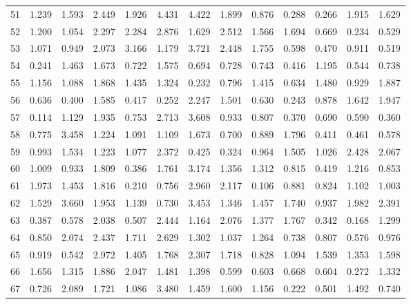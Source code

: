 \begin{tabular}{lrrrrrrrrrrrr}
51  &  1.239 &  1.593 &  2.449 &  1.926 &  4.431 &  4.422 &  1.899 &  0.876 &  0.288 &  0.266 &  1.915 &  1.629 \\
52  &  1.200 &  1.054 &  2.297 &  2.284 &  2.876 &  1.629 &  2.512 &  1.566 &  1.694 &  0.669 &  0.234 &  0.529 \\
53  &  1.071 &  0.949 &  2.073 &  3.166 &  1.179 &  3.721 &  2.448 &  1.755 &  0.598 &  0.470 &  0.911 &  0.519 \\
54  &  0.241 &  1.463 &  1.673 &  0.722 &  1.575 &  0.694 &  0.728 &  0.743 &  0.416 &  1.195 &  0.544 &  0.738 \\
55  &  1.156 &  1.088 &  1.868 &  1.435 &  1.324 &  0.232 &  0.796 &  1.415 &  0.634 &  1.480 &  0.929 &  1.887 \\
56  &  0.636 &  0.400 &  1.585 &  0.417 &  0.252 &  2.247 &  1.501 &  0.630 &  0.243 &  0.878 &  1.642 &  1.947 \\
57  &  0.114 &  1.129 &  1.935 &  0.753 &  2.713 &  3.608 &  0.933 &  0.807 &  0.370 &  0.690 &  0.590 &  0.360 \\
58  &  0.775 &  3.458 &  1.224 &  1.091 &  1.109 &  1.673 &  0.700 &  0.889 &  1.796 &  0.411 &  0.461 &  0.578 \\
59  &  0.993 &  1.534 &  1.223 &  1.077 &  2.372 &  0.425 &  0.324 &  0.964 &  1.505 &  1.026 &  2.428 &  2.067 \\
60  &  1.009 &  0.933 &  1.809 &  0.386 &  1.761 &  3.174 &  1.356 &  1.312 &  0.815 &  0.419 &  1.216 &  0.853 \\
61  &  1.973 &  1.453 &  1.816 &  0.210 &  0.756 &  2.960 &  2.117 &  0.106 &  0.881 &  0.824 &  1.102 &  1.003 \\
62  &  1.529 &  3.660 &  1.953 &  1.139 &  0.730 &  3.453 &  1.346 &  1.457 &  1.740 &  0.937 &  1.982 &  2.391 \\
63  &  0.387 &  0.578 &  2.038 &  0.507 &  2.444 &  1.164 &  2.076 &  1.377 &  1.767 &  0.342 &  0.168 &  1.299 \\
64  &  0.850 &  2.074 &  2.437 &  1.711 &  2.629 &  1.302 &  1.037 &  1.264 &  0.738 &  0.807 &  0.576 &  0.976 \\
65  &  0.919 &  0.542 &  2.972 &  1.405 &  1.768 &  2.307 &  1.718 &  0.828 &  1.094 &  1.539 &  1.353 &  1.598 \\
66  &  1.656 &  1.315 &  1.886 &  2.047 &  1.481 &  1.398 &  0.599 &  0.603 &  0.668 &  0.604 &  0.272 &  1.332 \\
67  &  0.726 &  2.089 &  1.721 &  1.086 &  3.480 &  1.459 &  1.600 &  1.156 &  0.222 &  0.501 &  1.492 &  0.740 \\

\end{tabular}
